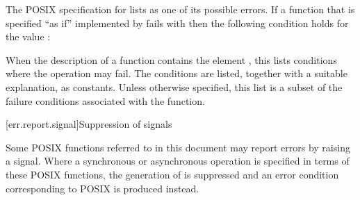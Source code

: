 \pnum
\begin{example} The POSIX specification for  lists  as one of its possible errors. If a function that is specified ``as if'' implemented by  fails with  then the following condition holds for the  value :  \end{example}

\pnum
When the description of a function contains the element
,
this lists conditions where the operation may fail.
The conditions are listed, together with a suitable explanation, as  constants.
Unless otherwise specified, this list is a subset of the failure conditions associated with the function.



[err.report.signal]{Suppression of signals}

\pnum
Some POSIX functions referred to in this document may report errors by raising a  signal. Where a synchronous or asynchronous operation is specified in terms of these POSIX functions, the generation of  is suppressed and an error condition corresponding to POSIX  is produced instead.



